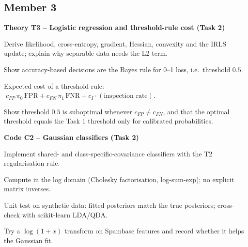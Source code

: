 \documentclass[11pt,a4paper]{article}
\begin{document}
\subsection*{Member 3}
\textbf{Theory T3 -- Logistic regression and threshold-rule cost (Task 2)}
\begin{todo}
  \item Derive likelihood, cross-entropy, gradient, Hessian, convexity and the IRLS update; explain why separable data needs the L2 term.
  \item Show accuracy-based decisions are the Bayes rule for 0--1 loss, i.e.\ threshold $0.5$.
  \item Expected cost of a threshold rule: $\;c_{FP}\,\pi_0\,\mathrm{FPR} + c_{FN}\,\pi_1\,\mathrm{FNR} + c_I \cdot (\text{inspection rate})$.
  \item Show threshold $0.5$ is suboptimal whenever $c_{FP}\neq c_{FN}$, and that the optimal threshold equals the Task 1 threshold only for calibrated probabilities.
\end{todo}
\textbf{Code C2 -- Gaussian classifiers (Task 2)}
\begin{todo}
  \item Implement shared- and class-specific-covariance classifiers with the T2 regularisation rule.
  \item Compute in the log domain (Cholesky factorisation, log-sum-exp); no explicit matrix inverses.
  \item Unit test on synthetic data: fitted posteriors match the true posteriors; cross-check with scikit-learn LDA/QDA.
  \item Try a $\log(1+x)$ transform on Spambase features and record whether it helps the Gaussian fit.
\end{todo}
\end{document}
